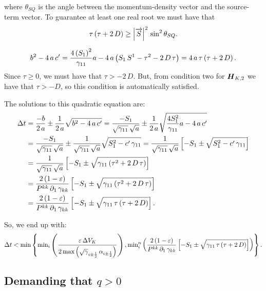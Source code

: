 \documentclass[10pt,preprint]{aastex}
\begin{document}
where $\theta_{SQ}$ is the angle between the momentum-density vector and the source-term vector. To guarantee at least one real root we must have that
\begin{equation}
    \tau\left(\tau+2\,D\right)\geq\left|\overrightarrow{S}\right|^{2}\,\sin^{2}\theta_{SQ}.
\end{equation}

\newpage
\begin{equation}
    b^{2}-4\,a\,c'=\frac{4\left(S_{1}\right)^{2}}{\gamma_{11}}a-4\,a\left(S_{1}\,S^{1}-\tau^{2}-2\,D\,\tau\right)=4\,a\,\tau\left(\tau+2\,D\right).
\end{equation}
Since $\tau\geq0$, we must have that $\tau>-2\,D$. But, from condition two for $\boldsymbol{H}_{K,2}$ we have that $\tau>-D$, so this condition is automatically satisfied.

The solutions to this quadratic equation are:
\begin{align}
    \Delta t&=\frac{-b}{2\,a}\pm\frac{1}{2\,a}\sqrt{b^{2}-4\,a\,c'}=\frac{-S_{1}}{\sqrt{\gamma_{11}}\,\sqrt{a}}\pm\frac{1}{2\,a}\sqrt{\frac{4S_{1}^{2}}{\gamma_{11}}a-4\,a\,c'}\\
    &=\frac{-S_{1}}{\sqrt{\gamma_{11}}\,\sqrt{a}}\pm\frac{1}{\sqrt{\gamma_{11}}\,\sqrt{a}}\sqrt{S_{1}^{2}-c'\,\gamma_{11}}=\frac{1}{\sqrt{\gamma_{11}}\,\sqrt{a}}\left[-S_{1}\pm\sqrt{S_{1}^{2}-c'\,\gamma_{11}}\right]\\
    &=\frac{1}{\sqrt{\gamma_{11}}\,\sqrt{a}}\left[-S_{1}\pm\sqrt{\gamma_{11}\left(\tau^{2}+2\,D\,\tau\right)}\right]\\
    &=\frac{2\left(1-\varepsilon\right)}{P^{kk}\,\partial_{1}\,\gamma_{kk}}\left[-S_{1}\pm\sqrt{\gamma_{11}\left(\tau^{2}+2\,D\,\tau\right)}\right]\\
    &=\frac{2\left(1-\varepsilon\right)}{P^{kk}\,\partial_{1}\,\gamma_{kk}}\left[-S_{1}\pm\sqrt{\gamma_{11}\,\tau\left(\tau+2\,D\right)}\right].
\end{align}

So, we end up with:
\begin{equation}
    \Delta t<\text{min}\left\{\text{min}_{i}\left(\frac{\varepsilon\,\Delta V_{K}}{2\,\text{max}\left(\sqrt{\gamma}_{i\pm\frac{1}{2}}\,\alpha_{i\pm\frac{1}{2}}\right)}\right),\text{min}^{n}_{i}\left(\frac{2\left(1-\varepsilon\right)}{P^{kk}\,\partial_{1}\,\gamma_{kk}}\left[-S_{1}\pm\sqrt{\gamma_{11}\,\tau\left(\tau+2\,D\right)}\right]\right)\right\}.
\end{equation}

\subsection{Demanding that $q>0$}
\end{document}
